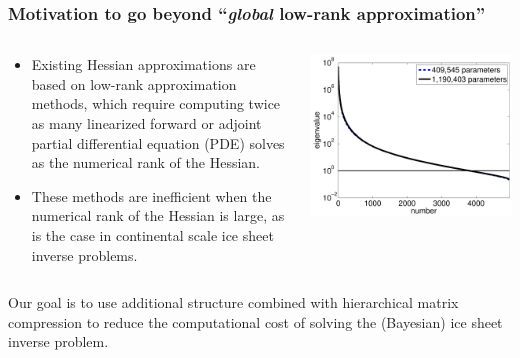 \documentclass[10pt,final,xcolor=dvipsnames]{beamer}
\begin{document}
\begin{frame}
  \frametitle{Motivation to go beyond ``{\it global} low-rank approximation''}

    \begin{columns}
    \begin{column}{0.6\paperwidth}
        \begin{itemize}
  \item Existing Hessian approximations are based on low-rank approximation
    methods, which require computing twice as many linearized forward or
    adjoint partial differential equation (PDE) solves as the numerical
    rank of the Hessian.
    \vspace{0.05in}
  \item These methods are inefficient when the numerical rank of the Hessian
    is large, as is the case in continental scale ice sheet inverse
    problems.

  \end{itemize}
    \end{column}
    \begin{column}{0.35\paperwidth}
    \vspace{0.1in}
      \centering\includegraphics[width=0.95\columnwidth]{extraplots/spec_ppmisfit_hess_coarseandfine_new.pdf}
    \end{column}
    \end{columns}

    \vspace{0.1in}
    \begin{center}
      \alert{Our goal is to use additional structure combined with
        hierarchical matrix compression to reduce the
        computational cost of solving the (Bayesian) ice sheet inverse
        problem.}
    \end{center}
\end{frame}
\end{document}
